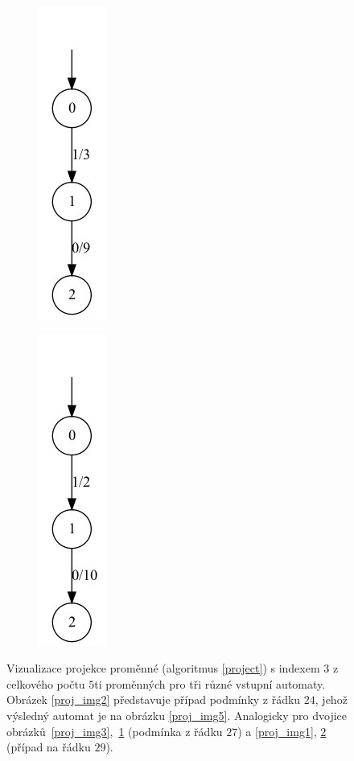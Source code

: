 \begin{figure}[h]
\begin{subfigure}{.15\textwidth}
        \centering
        \includegraphics[scale=0.3]{obrazky-figures/proj_img6.png}
        \caption{}
        \label{proj_img6}
    \end{subfigure}
    \hfil
    \begin{subfigure}{.15\textwidth}
        \centering
        \includegraphics[scale=0.3]{obrazky-figures/proj_img4.png}
        \caption{}
        \label{proj_img4}
    \end{subfigure}
    \caption{Vizualizace projekce proměnné (algoritmus \ref{project}) s indexem $3$ z celkového počtu $5$ti proměnných pro tři různé vstupní automaty. Obrázek \ref{proj_img2} představuje případ podmínky z řádku $24$, jehož výsledný automat je na obrázku \ref{proj_img5}. Analogicky pro dvojice obrázků~\ref{proj_img3},~\ref{proj_img6} (podmínka z řádku $27$) a \ref{proj_img1}, \ref{proj_img4} (případ na řádku $29$).}
    \label{proj_img}
\end{figure}

